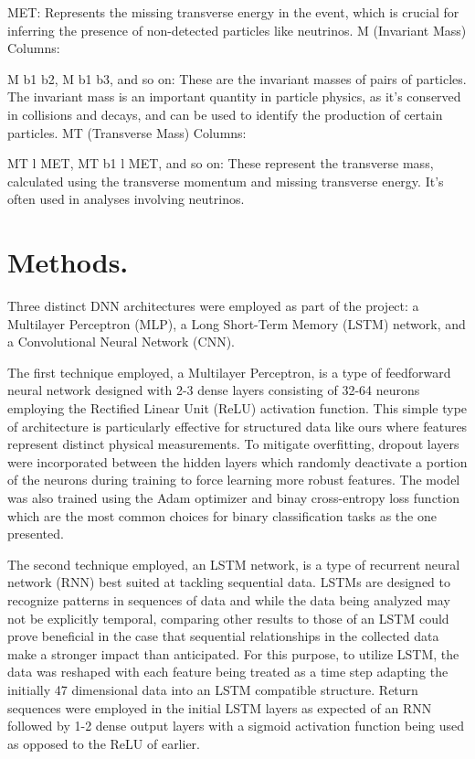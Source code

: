 \documentclass[twocolumn]{webofc}
\begin{document}
MET: Represents the missing transverse energy in the event, which is crucial for inferring the presence of non-detected particles like neutrinos.
M (Invariant Mass) Columns:

M b1 b2, M b1 b3, and so on: These are the invariant masses of pairs of particles. The invariant mass is an important quantity in particle physics, as it's conserved in collisions and decays, and can be used to identify the production of certain particles.
MT (Transverse Mass) Columns:

MT l MET, MT b1 l MET, and so on: These represent the transverse mass, calculated using the transverse momentum and missing transverse energy. It's often used in analyses involving neutrinos.

\section*{Methods.}\label{sec:readme}
Three distinct DNN architectures were employed as part of the project: a Multilayer Perceptron (MLP), a Long Short-Term Memory (LSTM) network, and a Convolutional Neural Network (CNN).

The first technique employed, a Multilayer Perceptron, is a type of feedforward neural network designed with 2-3 dense layers consisting of 32-64 neurons employing the Rectified Linear Unit (ReLU) activation function. This simple type of architecture is particularly effective for structured data like ours where features represent distinct physical measurements. To mitigate overfitting, dropout layers were incorporated between the hidden layers which randomly deactivate a portion of the neurons during training to force learning more robust features. The model was also trained using the Adam optimizer and binay cross-entropy loss function which are the most common choices for binary classification tasks as the one presented.

The second technique employed, an LSTM network, is a type of recurrent neural network (RNN) best suited at tackling sequential data. LSTMs are designed to recognize patterns in sequences of data and while the data being analyzed may not be explicitly temporal, comparing other results to those of an LSTM could prove beneficial in the case that sequential relationships in the collected data make a stronger impact than anticipated. For this purpose, to utilize LSTM, the data was reshaped with each feature being treated as a time step adapting the initially 47 dimensional data into an LSTM compatible structure. Return sequences were employed in the initial LSTM layers as expected of an RNN followed by 1-2 dense output layers with a sigmoid activation function being used as opposed to the ReLU of earlier.
\end{document}
